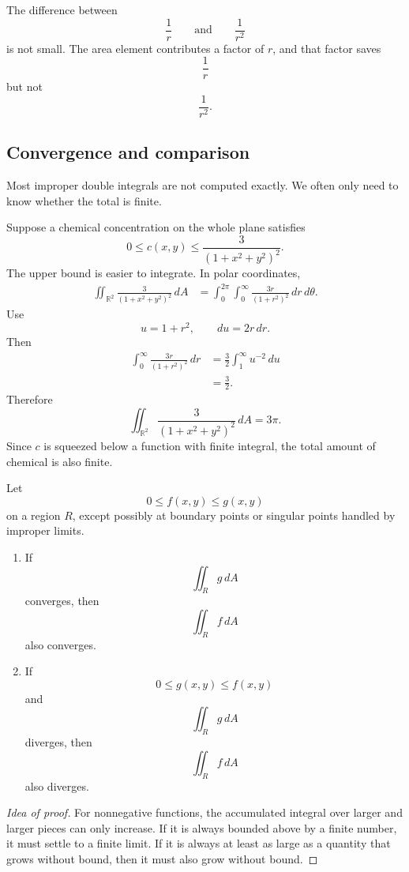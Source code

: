 The difference between
\[
    \frac1r
    \qquad\text{and}\qquad
    \frac1{r^2}
\]
is not small.  The area element contributes a factor of \(r\), and that factor saves
\[
    \frac1r
\]
but not
\[
    \frac1{r^2}.
\]

\subsection{Convergence and comparison}

Most improper double integrals are not computed exactly.  We often only need to know
whether the total is finite.

Suppose a chemical concentration on the whole plane satisfies
\[
    0\le c(x,y)\le \frac{3}{(1+x^2+y^2)^2}.
\]
The upper bound is easier to integrate.  In polar coordinates,
\[
\begin{aligned}
\iint_{\mathbb R^2}\frac{3}{(1+x^2+y^2)^2}\,dA
&=
\int_0^{2\pi}\int_0^\infty \frac{3r}{(1+r^2)^2}\,dr\,d\theta.
\end{aligned}
\]
Use
\[
    u=1+r^2,
    \qquad
    du=2r\,dr.
\]
Then
\[
\begin{aligned}
\int_0^\infty \frac{3r}{(1+r^2)^2}\,dr
&=
\frac32\int_1^\infty u^{-2}\,du\\
&=
\frac32.
\end{aligned}
\]
Therefore
\[
    \iint_{\mathbb R^2}\frac{3}{(1+x^2+y^2)^2}\,dA
    =
    3\pi.
\]
Since \(c\) is squeezed below a function with finite integral, the total amount of
chemical is also finite.

\begin{theorem}
Let
\[
    0\le f(x,y)\le g(x,y)
\]
on a region \(R\), except possibly at boundary points or singular points handled by
improper limits.

\begin{enumerate}
\item If
\[
    \iint_R g\,dA
\]
converges, then
\[
    \iint_R f\,dA
\]
also converges.

\item If
\[
    0\le g(x,y)\le f(x,y)
\]
and
\[
    \iint_R g\,dA
\]
diverges, then
\[
    \iint_R f\,dA
\]
also diverges.
\end{enumerate}
\end{theorem}

\begin{proof}[Idea of proof]
For nonnegative functions, the accumulated integral over larger and larger pieces can
only increase.  If it is always bounded above by a finite number, it must settle to a
finite limit.  If it is always at least as large as a quantity that grows without bound,
then it must also grow without bound.
\end{proof}

